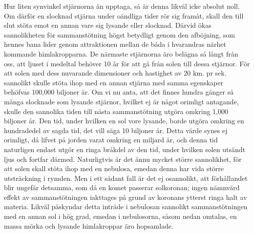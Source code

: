 \documentclass[a4paper, 12pt, oneside, swedish]{article}
\begin{document}
Hur liten synvinkel stjärnorna än upptaga, så är denna likväl icke absolut noll. Om därför en slocknad stjärna under oändliga tider rör sig framåt, skall den till slut stöta emot en annan vare sig lysande eller slocknad. Därvid ökas sannolikheten för sammanstötning högst betydligt genom den afböjning, som hennes bana lider genom attraktionen mellan de båda i hvarandras närhet kommande himlakropparna. De närmaste stjärnorna äro belägna så långt från oss, att ljuset i medeltal behöver 10 år för att gå från solen till dessa stjärnor. För att solen med dess nuvarande dimensioner och hastighet av 20 km. pr sek. sannolikt skulle stöta ihop med en annan stjärna med samma egenskaper behöfvas 100,000 biljoner år. Om vi nu anta, att det finnes hundra gånger så många slocknade som lysande stjärnor, hvilket ej är något orimligt antagande, skulle den sannolika tiden till nästa sammanstötning utgöra omkring 1,000 biljoner år. Den tid, under hvilken en sol vore lysande, borde utgöra omkring en hundradedel av sagda tid, det vill säga 10 biljoner år. Detta värde synes ej orimligt, då lifvet på jorden varat omkring en miljard år, och denna tid naturligen endast utgör en ringa bråkdel av den tid, under hvilken solen utsändt ljus och fortfar därmed. Naturligtvis är det ännu mycket större sannolikhet, för att solen skall stöta ihop med en nebulosa, emedan denna har vida större utsträckning i rymden. Men i ett sådant fall är det ej osannolikt, att förhållandet blir ungefär detsamma, som då en komet passerar solkoronan; ingen nämnvärd effekt av sammanstötningen iakttages på grund av koronans ytterst ringa halt av materia. Likväl påskyndar detta inträde i nebulosan sannolikt sammanstötningen med en annan sol i hög grad, emedan i nebulosorna, såsom nedan omtalas, en massa mörka och lysande himlakroppar äro hopsamlade.
\end{document}
